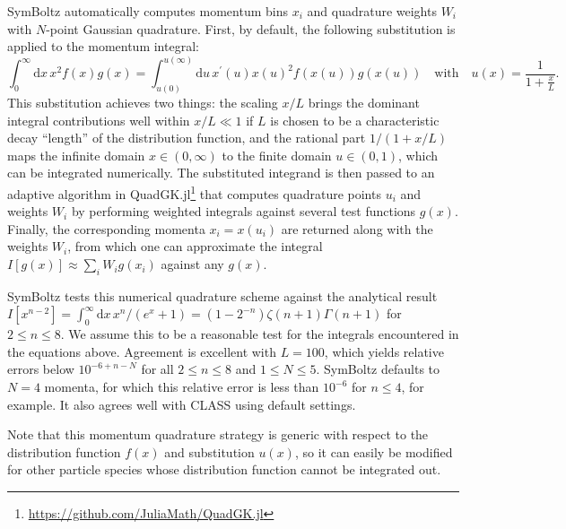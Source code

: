 \documentclass{aa}
\begin{document}
SymBoltz automatically computes momentum bins $x_i$ and quadrature weights $W_i$ with $N$-point Gaussian quadrature.
First, by default, the following substitution is applied to the momentum integral:
\begin{equation*}
    \int_0^\infty \mathrm{d}x \, x^2 f(x) g(x) = \int_{u(0)}^{u(\infty)} \mathrm{d}u \, x^\prime(u) x(u)^2 f(x(u)) g(x(u))
    \quad \text{with} \quad
    u(x) = \frac{1}{1+\frac{x}{L}} .
\end{equation*}
This substitution achieves two things: the scaling $x/L$ brings the dominant integral contributions well within $x/L \ll 1$ if $L$ is chosen to be a characteristic decay \enquote{length} of the distribution function, and the rational part $1/(1+x/L)$ maps the infinite domain $x \in (0, \infty)$ to the finite domain $u \in (0, 1)$, which can be integrated numerically.
The substituted integrand is then passed to an adaptive algorithm in QuadGK.jl\footnote{\url{https://github.com/JuliaMath/QuadGK.jl}} that computes quadrature points $u_i$ and weights $W_i$ by performing weighted integrals against several test functions $g(x)$.
Finally, the corresponding momenta $x_i = x(u_i)$ are returned along with the weights $W_i$, from which one can approximate the integral $I[g(x)] \approx \sum_i W_i g(x_i)$ against any $g(x)$.

SymBoltz tests this numerical quadrature scheme against the analytical result $I[x^{n-2}] = \int_0^\infty \mathrm{d}x \, x^n / (e^x+1) = (1-2^{-n}) \zeta(n+1) \Gamma(n+1)$ for $2 \leq n \leq 8$.
We assume this to be a reasonable test for the integrals encountered in the equations above. 
Agreement is excellent with $L = 100$, which yields relative errors below $10^{-6+n-N}$ for all $2 \leq n \leq 8$ and $1 \leq N \leq 5$.
SymBoltz defaults to $N=4$ momenta, for which this relative error is less than $10^{-6}$ for $n \leq 4$, for example.
It also agrees well with CLASS using default settings.

Note that this momentum quadrature strategy is generic with respect to the distribution function $f(x)$ and substitution $u(x)$, so it can easily be modified for other particle species whose distribution function cannot be integrated out.
\end{document}
